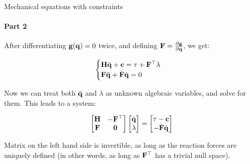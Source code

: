 \documentclass{beamer}
\begin{document}
\begin{frame}{Mechanical equations with constraints}
\framesubtitle{Part 2}
\begin{flushleft}

After differentiating $\mathbf{g}(\mathbf{q}) = 0$ twice, and defining $\mathbf{F} = \frac{\partial \mathbf{g}}{\partial \mathbf{q}}$, we get:

\begin{equation}
\begin{cases}
    \mathbf{H} \ddot{\mathbf{q}} + \mathbf{c} = \tau + \mathbf{F}^\top \lambda \\
    \mathbf{F} \ddot{\mathbf{q}} + \dot{\mathbf{F}} \dot{\mathbf{q}} = 0
\end{cases}
\end{equation}

Now we can treat both $\ddot{\mathbf{q}}$ and $\lambda$ as unknown algebraic variables, and solve for them. This leads to a system:

\begin{equation}
\begin{bmatrix}
    \mathbf{H} & -\mathbf{F}^\top \\
    \mathbf{F} & \mathbf{0}
\end{bmatrix}
\begin{bmatrix}
    \ddot{\mathbf{q}} \\
    \lambda
\end{bmatrix}
=
\begin{bmatrix}
    \tau - \mathbf{c} \\
    -\dot{\mathbf{F}} \dot{\mathbf{q}}
\end{bmatrix}
\end{equation}

Matrix on the left hand side is invertible, as long as the reaction forces are uniquely defined (in other words, as long as $\mathbf{F}^\top$ has a trivial null space).

\end{flushleft}
\end{frame}
\end{document}
